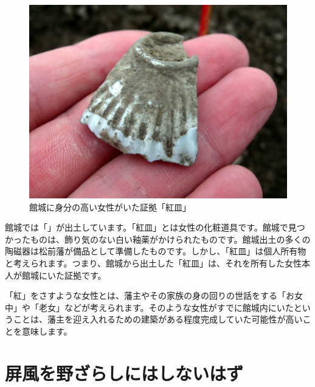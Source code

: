 \documentclass[11pt,report]{jsbook}
\begin{document}
\begin{figure}
\vspace*{-\intextsep} 
\centering
\includegraphics[width=40truemm]{fig/17.JPG}
\caption{館城に身分の高い女性がいた証拠「紅皿」}
\label{fig17}
\end{figure}

館城では「」が出土しています。「紅皿」とは女性の化粧道具です。館城で見つかったものは、飾り気のない白い釉薬がかけられたものです。館城出土の多くの陶磁器は松前藩が備品として準備したものです。しかし、「紅皿」は個人所有物と考えられます。つまり、館城から出土した「紅皿」は、それを所有した女性本人が館城にいた証拠です。

「紅」をさすような女性とは、藩主やその家族の身の回りの世話をする「お女中」や「老女」などが考えられます。そのような女性がすでに館城内にいたということは、藩主を迎え入れるための建築がある程度完成していた可能性が高いことを意味します。

\section{屏風を野ざらしにはしないはず}
\end{document}
